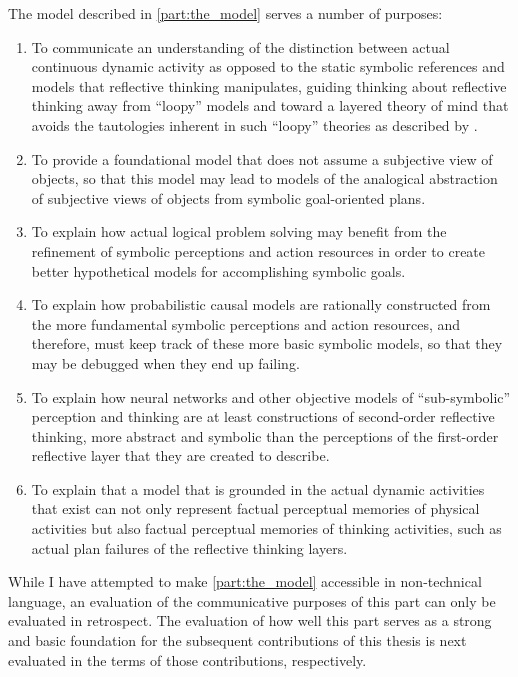The model described in {\mbox{\autoref{part:the_model}}} serves a
number of purposes:
\begin{enumerate}
\item To communicate an understanding of the distinction between
  actual continuous dynamic activity as opposed to the static symbolic
  references and models that reflective thinking manipulates, guiding
  thinking about reflective thinking away from ``loopy'' models and
  toward a layered theory of mind that avoids the tautologies inherent
  in such ``loopy'' theories as described by \cite{perlis:2008}.
\item To provide a foundational model that does not assume a
  subjective view of objects, so that this model may lead to models of
  the analogical abstraction of subjective views of objects from
  symbolic goal-oriented plans.
\item To explain how actual logical problem solving may benefit from
  the refinement of symbolic perceptions and action resources in order
  to create better hypothetical models for accomplishing symbolic
  goals.
\item To explain how probabilistic causal models are rationally
  constructed from the more fundamental symbolic perceptions and
  action resources, and therefore, must keep track of these more basic
  symbolic models, so that they may be debugged when they end up
  failing.
\item To explain how neural networks and other objective models of
  ``sub-symbolic'' perception and thinking are at least constructions
  of second-order reflective thinking, more abstract and symbolic than
  the perceptions of the first-order reflective layer that they are
  created to describe.
\item To explain that a model that is grounded in the actual dynamic
  activities that exist can not only represent factual perceptual
  memories of physical activities but also factual perceptual memories
  of thinking activities, such as actual plan failures of the
  reflective thinking layers.
\end{enumerate}
While I have attempted to make {\mbox{\autoref{part:the_model}}}
accessible in non-technical language, an evaluation of the
communicative purposes of this part can only be evaluated in
retrospect.  The evaluation of how well this part serves as a strong
and basic foundation for the subsequent contributions of this thesis
is next evaluated in the terms of those contributions, respectively.


